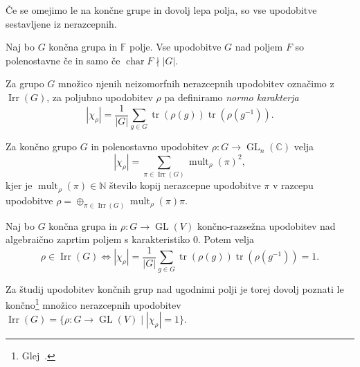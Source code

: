 \documentclass[mat2, tisk]{fmfdelo}
\newcommand{\N}{\mathbb N}
\newcommand{\C}{\mathbb C}
\begin{document}
Če se omejimo le na končne grupe in dovolj lepa polja, so vse
upodobitve sestavljene iz nerazcepnih.
\begin{izrek}%
  Naj bo $G$ končna grupa in $\mathbb{F}$
  polje. Vse upodobitve $G$ nad poljem $F$ so polenostavne če in
  samo če $\operatorname{char}F \nmid |G|$.
\end{izrek}
Za grupo $G$ množico njenih neizomorfnih nerazcepnih upodobitev
označimo z $\operatorname{Irr}(G)$, za poljubno upodobitev
$\rho$ pa definiramo \emph{normo karakterja}
\begin{equation}
  \label{eq:norma karakterja}
  |\chi_\rho| = \frac{1}{|G|} \sum\limits_{g \in G}
  \operatorname{tr}(\rho(g)) \operatorname{tr}(\rho(g^{-1})).
\end{equation}
\begin{izrek}
  \label{izrek:celostevilski_karakter}
  Za končno grupo $G$ in polenostavno upodobitev $\rho \colon G
  \to \operatorname{GL}_n(\C)$ velja
  $$
  |\chi_\rho| = \sum\limits_{\pi \in \operatorname{Irr}(G)}
  \operatorname{mult}_\rho(\pi)^2,
  $$
  kjer je $\operatorname{mult}_\rho(\pi) \in \N$ število kopij
  nerazcepne upodobitve
  $\pi$ v razcepu upodobitve $\rho = \oplus_{\pi \in
  \operatorname{Irr}(G)} \operatorname{mult}_\rho(\pi) \pi$.
\end{izrek}
\begin{izrek}
  Naj bo $G$ končna grupa in $\rho \colon G \to
  \operatorname{GL}(V)$ končno-razsežna upodobitev nad
  algebraično zaprtim poljem s karakteristiko $0$. Potem velja
  \begin{equation}
    \label{eq:nerazcepna iff norma=1}
    \rho \in \operatorname{Irr}(G) \iff |\chi_\rho| = \frac{1}{|G|}
    \sum\limits_{g \in G} \operatorname{tr}(\rho(g))
    \operatorname{tr}(\rho(g^{-1})) = 1.
  \end{equation}
\end{izrek}
Za študij upodobitev končnih grup nad ugodnimi polji je torej
dovolj poznati le končno\footnote{Glej~\cite[poglavje
    \emph{Dekompozicija regularne
upodobitve}]{jezernik2025upodobitve}.} množico nerazcepnih
upodobitev $\operatorname{Irr}(G) = \{ \rho \colon G \to
\operatorname{GL}(V) \mid |\chi_\rho| = 1\}$.
\end{document}
